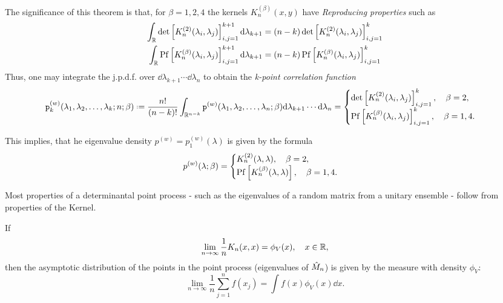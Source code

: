 The significance of this theorem is that, for $\beta = 1, 2, 4$ the kernels $K_n^{(\beta)}(x,y)$ have \textit{Reproducing properties} such as
\begin{align}
	\int_{\mathbb{R}} \det\left[ K_n^{(2)}(\lambda_i, \lambda_j) \right]_{i,j=1}^{k+1} \mathrm{d} \lambda_{k+1} & = (n-k) \det\left[ K_n^{(2)}(\lambda_i, \lambda_j) \right]_{i,j=1}^{k} \\
	\int_{\mathbb{R}} \operatorname{Pf}\left[ K_n^{(\beta)}(\lambda_i, \lambda_j) \right]_{i,j=1}^{k+1} \mathrm{d} \lambda_{k+1} & = (n-k)  \operatorname{Pf}\left[ K_n^{(\beta)}(\lambda_i, \lambda_j) \right]_{i,j=1}^{k}
	\label{Eq: Reproducibility}
\end{align}
Thus, one may integrate the j.p.d.f. over $\dd \lambda_{k+1} \cdots \dd \lambda_n$ to obtain the \textit{k-point correlation function}
\begin{equation}
	\p_k^{(w)}(\mmany{\lambda}{k};n;\beta) \deff \frac{n!}{(n-k)!} \int_{\R^{n-k}} \p^{(w)}(\mmany{\lambda}{n};\beta) \dd \lambda_{k+1} \cdots \dd \lambda_n \\
	=
	\begin{cases}
		\det\left[ K_n^{(2)}(\lambda_i, \lambda_j) \right]_{i,j=1}^{k}, \quad \beta = 2, \\
		\pf\left[ K_n^{(\beta)}(\lambda_i, \lambda_j) \right]_{i,j=1}^{k}, \quad \beta = 1,4.
	\end{cases}
\end{equation}

This implies, that he eigenvalue density $p^{(w)} = p_1^{(w)}(\lambda)$ is given by the formula
\begin{equation}
	p^{(w)}(\lambda; \beta) = 
	\begin{cases}
		K_n^{(2)}(\lambda, \lambda), \quad \beta = 2, \\
		\operatorname{Pf}\left[ K_n^{(\beta)}(\lambda, \lambda) \right], \quad \beta = 1,4.
	\end{cases}
\end{equation}

Most properties of a determinantal point process - such as the eigenvalues of a random matrix from a unitary ensemble - follow from properties of the Kernel. 

\begin{teorema}
	If
	\begin{equation}
		\lim_{n \rightarrow \infty} \frac{1}{n} K_n(x,x) = \phi_V(x), \quad x \in \mathbb{R},
	\end{equation}	
	then the asymptotic distribution of the points in the point process (eigenvalues of $\hat M_n$) is given by the measure with density $\phi_V$:
	\begin{equation}
		\lim_{n \rightarrow \infty} \frac{1}{n} \sum_{j=1}^{n} f(x_j) = \int f(x) \phi_V(x) \dd x.
	\end{equation}
\end{teorema}

